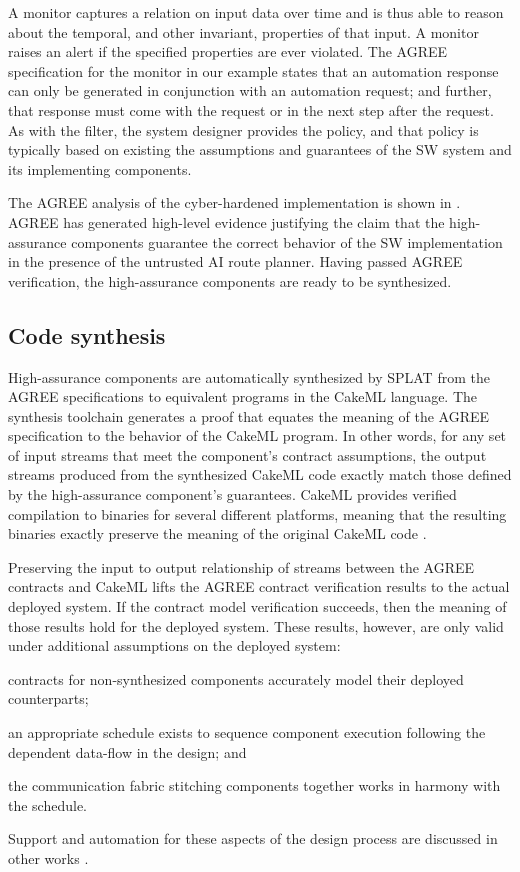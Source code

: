 A monitor captures a relation on input data over time and is thus able
to reason about the temporal, and other invariant, properties of that input.  A monitor raises
an alert if the specified properties are ever violated.  The
AGREE specification for the monitor in our example states that an
automation response can only be generated in conjunction with an
automation request; and further, that response must come with the
request or in the next step after the request.  As with the filter,
the system designer provides the policy, and that policy is typically
based on existing the assumptions and guarantees of the SW system and its implementing components.

The AGREE analysis of the cyber-hardened implementation is shown in
. AGREE has generated high-level
evidence justifying the claim that the high-assurance components
guarantee the correct behavior of the SW implementation in the
presence of the untrusted AI route planner.  Having passed AGREE
verification, the high-assurance components are ready to be
synthesized.

\subsection{Code synthesis}
High-assurance components are automatically synthesized by SPLAT from
the AGREE specifications to equivalent programs in the CakeML
language.  The synthesis toolchain generates a proof that equates the
meaning of the AGREE specification to the behavior of the CakeML
program.  In other words, for any set of input streams that meet the
component's contract assumptions, the output streams produced from the
synthesized CakeML code exactly match those defined by the
high-assurance component's guarantees.  CakeML provides verified
compilation to binaries for several different platforms, meaning that
the resulting binaries exactly preserve the meaning of the original
CakeML code \cite{cakeml}.

Preserving the input to output relationship of streams between the
AGREE contracts and CakeML lifts the AGREE contract verification
results to the actual deployed system.  If the contract model
verification succeeds, then the meaning of those results hold for the
deployed system.  These results, however, are only valid under
additional assumptions on the deployed system:
\begin{compactitem}
\item contracts for non-synthesized components accurately model their deployed
counterparts;
\item an appropriate schedule exists to sequence component
  execution following the dependent data-flow in the design; and
\item the communication fabric stitching components together works in harmony
  with the schedule.
\end{compactitem}
\noindent Support and automation for these aspects of the design process are
discussed in other works \cite{gearcase2020, dcrypps2019, 10.1007/978-3-030-89159-6_18, 10.1007/978-3-030-89159-6_17, sel4-2009, scheduled-agree, 9734792}.
